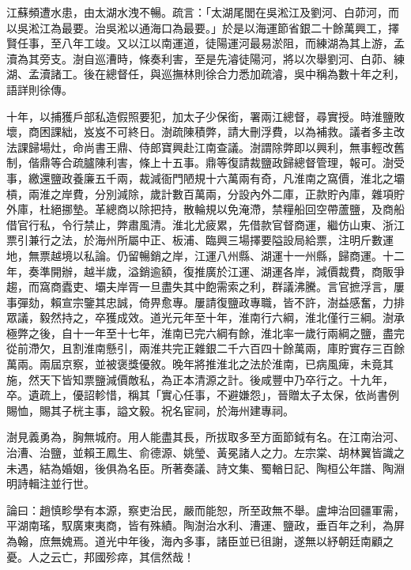 \begin{pinyinscope}
江蘇頻遭水患，由太湖水洩不暢。疏言：「太湖尾閭在吳淞江及劉河、白茆河，而以吳淞江為最要。治吳淞以通海口為最要。」於是以海運節省銀二十餘萬興工，擇賢任事，至八年工竣。又以江以南運道，徒陽運河最易淤阻，而練湖為其上游，孟瀆為其旁支。澍自巡漕時，條奏利害，至是先濬徒陽河，將以次舉劉河、白茆、練湖、孟瀆諸工。後在總督任，與巡撫林則徐合力悉加疏濬，吳中稱為數十年之利，語詳則徐傳。

十年，以捕獲戶部私造假照要犯，加太子少保銜，署兩江總督，尋實授。時淮鹽敗壞，商困課絀，岌岌不可終日。澍疏陳積弊，請大刪浮費，以為補救。議者多主改法課歸場灶，命尚書王鼎、侍郎寶興赴江南查議。澍謂除弊即以興利，無事輕改舊制，偕鼎等合疏臚陳利害，條上十五事。鼎等復請裁鹽政歸總督管理，報可。澍受事，繳還鹽政養廉五千兩，裁減衙門陋規十六萬兩有奇，凡淮南之窩價，淮北之壩槓，兩淮之岸費，分別減除，歲計數百萬兩，分設內外二庫，正款貯內庫，雜項貯外庫，杜絕挪墊。革總商以除把持，散輪規以免淹滯，禁糧船回空帶蘆鹽，及商船借官行私，令行禁止，弊肅風清。淮北尤疲累，先借款官督商運，繼仿山東、浙江票引兼行之法，於海州所屬中正、板浦、臨興三場擇要隘設局給票，注明斤數運地，無票越境以私論。仍留暢銷之岸，江運八州縣、湖運十一州縣，歸商運。十二年，奏準開辦，越半歲，溢銷逾額，復推廣於江運、湖運各岸，減價裁費，商販爭趨，而窩商蠹吏、壩夫岸胥一旦盡失其中飽需索之利，群議沸騰。言官摭浮言，屢事彈劾，賴宣宗鑒其忠誠，倚畀愈專。屢請復鹽政專職，皆不許，澍益感奮，力排眾議，毅然持之，卒獲成效。道光元年至十年，淮南行六綱，淮北僅行三綱。澍承極弊之後，自十一年至十七年，淮南已完六綱有餘，淮北率一歲行兩綱之鹽，盡完從前滯欠，且割淮南懸引，兩淮共完正雜銀二千六百四十餘萬兩，庫貯實存三百餘萬兩。兩屆京察，並被褒獎優敘。晚年將推淮北之法於淮南，已病風痺，未竟其施，然天下皆知票鹽減價敵私，為正本清源之計。後咸豐中乃卒行之。十九年，卒。遺疏上，優詔軫惜，稱其「實心任事，不避嫌怨」，晉贈太子太保，依尚書例賜恤，賜其子桄主事，謚文毅。祝名宦祠，於海州建專祠。

澍見義勇為，胸無城府。用人能盡其長，所拔取多至方面節鉞有名。在江南治河、治漕、治鹽，並賴王鳳生、俞德源、姚瑩、黃冕諸人之力。左宗棠、胡林翼皆識之未遇，結為婚姻，後俱為名臣。所著奏議、詩文集、蜀輶日記、陶桓公年譜、陶淵明詩輯注並行世。

論曰：趙慎畛學有本源，察吏治民，嚴而能恕，所至政無不舉。盧坤治回疆軍需，平湖南瑤，馭廣東夷商，皆有殊績。陶澍治水利、漕運、鹽政，垂百年之利，為屏為翰，庶無媿焉。道光中年後，海內多事，諸臣並已徂謝，遂無以紓朝廷南顧之憂。人之云亡，邦國殄瘁，其信然哉！


\end{pinyinscope}